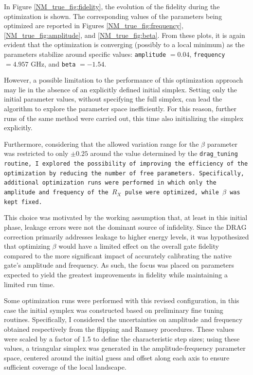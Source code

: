 In Figure \ref{NM_true_fig:fidelity}, the evolution of the fidelity during the optimization is shown. 
The corresponding values of the parameters being optimized are reported in Figures \ref{NM_true_fig:frequency}, \ref{NM_true_fig:amplitude}, and \ref{NM_true_fig:beta}. 
From these plots, it is again evident that the optimization is converging (possibly to a local minimum) as the parameters stabilize around specific values: \texttt{amplitude} $= 0.04$, \texttt{frequency} $= 4.957$ GHz, and \texttt{beta} $= -1.54$.

However, a possible limitation to the performance of this optimization approach may lie in the absence of an explicitly defined initial simplex.
Setting only the initial parameter values, without specifying the full simplex, can lead the algorithm to explore the parameter space inefficiently. 
For this reason, further runs of the same method were carried out, this time also initializing the simplex explicitly.

Furthermore, considering that the allowed variation range for the $\beta$ parameter was restricted to only $\pm0.25$ around the value determined by the \tt{drag\_tuning} routine, I explored the possibility of improving the efficiency of the optimization by reducing the number of free parameters. 
Specifically, additional optimization runs were performed in which only the amplitude and frequency of the $R_X$ pulse were optimized, while $\beta$ was kept fixed.

This choice was motivated by the working assumption that, at least in this initial phase, leakage errors were not the dominant source of infidelity. 
Since the DRAG correction primarily addresses leakage to higher energy levels, it was hypothesized that optimizing $\beta$ would have a limited effect on the overall gate fidelity compared to the more significant impact of accurately calibrating the native gate's amplitude and frequency. 
As such, the focus was placed on parameters expected to yield the greatest improvements in fidelity while maintaining a limited run time.

Some optimization runs were performed with this revised configuration, in this case the initial symplex was constructed based on preliminary fine tuning routines. 
Specifically, I considered the uncertainties on amplitude and frequency obtained respectively from the flipping and Ramsey procedures.
These values were scaled by a factor of 1.5 to define the characteristic step sizes; using these values, a triangular simplex was generated in the amplitude-frequency parameter space, centered around the initial guess and offset along each axis to ensure sufficient coverage of the local landscape.

